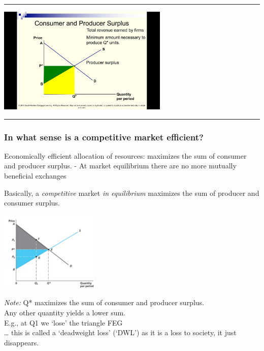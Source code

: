 \documentclass[]{article}
\begin{document}
\begin{center}\rule{0.5\linewidth}{\linethickness}\end{center}

\includegraphics[height=2in]{picsfigs/prodsurp3.png}

\begin{center}\rule{0.5\linewidth}{\linethickness}\end{center}

\hypertarget{in-what-sense-is-a-competitive-market-efficient}{%
\subsubsection{In what sense is a competitive market efficient?}\label{in-what-sense-is-a-competitive-market-efficient}}

Economically efficient allocation of resources: maximizes the sum of consumer and producer surplus.
- At market equilibrium there are no more mutually beneficial exchanges

\bigskip

Basically, a \emph{competitive} market \emph{in equilibrium} maximizes the sum of producer and consumer surplus.

\includegraphics[height=1.5in]{picsfigs/consumerprodrsurplusmax.png}

\emph{Note:}
Q* maximizes the sum of consumer and producer surplus.\\
Any other quantity yields a lower sum.\\
E.g., at Q1 we `lose' the triangle FEG\\
\ldots{} this is called a `deadweight loss' (`DWL') as it is a loss to society, it just disappears.
\end{document}
